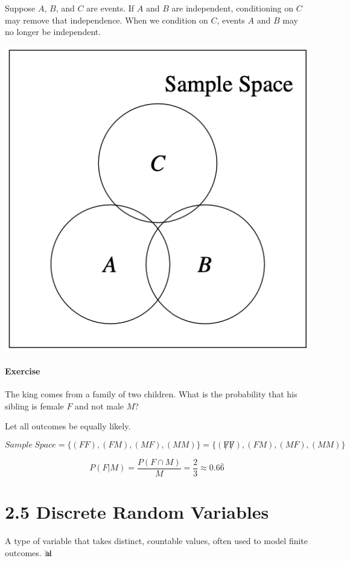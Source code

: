 \documentclass[
  letterpaper,
  DIV=11,
  numbers=noendperiod]{scrreprt}
\begin{document}
Suppose \(A\), \(B\), and \(C\) are events. If \(A\) and \(B\) are
independent, conditioning on \(C\) may remove that independence. When we
condition on \(C\), events \(A\) and \(B\) may no longer be independent.

\includegraphics[width=0.3\linewidth,height=\textheight,keepaspectratio]{lecture2/images/condind.png}

\subsubsection{Exercise}\label{exercise-7}

The king comes from a family of two children. What is the probability
that his sibling is female \(F\) and not male \(M\)?

Let all outcomes be equally likely.

\begin{tcolorbox}[enhanced jigsaw, opacityback=0, left=2mm, breakable, bottomtitle=1mm, rightrule=.15mm, colframe=quarto-callout-tip-color-frame, titlerule=0mm, colback=white, opacitybacktitle=0.6, toptitle=1mm, title=\textcolor{quarto-callout-tip-color}{\faLightbulb}\hspace{0.5em}{Solution}, colbacktitle=quarto-callout-tip-color!10!white, bottomrule=.15mm, arc=.35mm, coltitle=black, leftrule=.75mm, toprule=.15mm]

\[
Sample \ Space = \{(FF), (FM), (MF), (MM)\} = \{(\not F \not F), (FM), (MF), (MM)\}
\]

\[
P(F|M) = \frac{P(F \cap M)}{M} = \frac{2}{3} \approx 0.6\bar{6}
\]

\end{tcolorbox}

\chapter{2.5 Discrete Random Variables}\label{discrete-random-variables}

\begin{tcolorbox}[enhanced jigsaw, colback=white, left=2mm, breakable, opacityback=0, bottomrule=.15mm, rightrule=.15mm, arc=.35mm, colframe=quarto-callout-note-color-frame, leftrule=.75mm, toprule=.15mm]

A type of variable that takes distinct, countable values, often used to
model finite outcomes. 📊

\end{tcolorbox}
\end{document}
